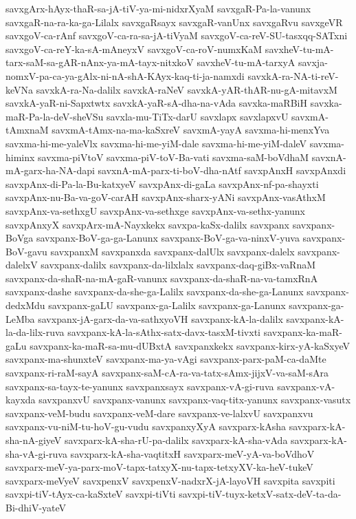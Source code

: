 {savxgArx-hAyx-thaR-sa-jA-tiV-ya-mi-nidxrXyaM
savxgaR-Pa-la-vanunx
savxgaR-na-ra-ka-ga-Lilalx
savxgaRsayx
savxgaR-vanUnx
savxgaRvu
savxgeVR
savxgoV-ca-rAnf
savxgoV-ca-ra-sa-jA-tiVyaM
savxgoV-ca-reV-SU-tasxqq-SATxni
savxgoV-ca-reY-ka-sA-mAneyxV
savxgoV-ca-roV-numxKaM
savxheV-tu-mA-tarx-saM-sa-gAR-nAnx-ya-mA-tayx-nitxkoV
savxheV-tu-mA-tarxyA
savxja-nomxV-pa-ca-ya-gAlx-ni-nA-shA-KAyx-kaq-ti-ja-namxdi
savxkA-ra-NA-ti-reV-keVNa
savxkA-ra-Na-dalilx
savxkA-raNeV
savxkA-yAR-thAR-nu-gA-mitavxM
savxkA-yaR-ni-Sapxtwtx
savxkA-yaR-sA-dha-na-vAda
savxka-maRBiH
savxka-maR-Pa-la-deV-sheVSu
savxla-mu-TiTx-darU
savxlapx
savxlapxvU
savxmA-tAmxnaM
savxmA-tAmx-na-ma-kaSxreV
savxmA-yayA
savxma-hi-menxYva
savxma-hi-me-yaleVlx
savxma-hi-me-yiM-dale
savxma-hi-me-yiM-daleV
savxma-himinx
savxma-piVtoV
savxma-piV-toV-Ba-vati
savxma-saM-boVdhaM
savxnA-mA-garx-ha-NA-dapi
savxnA-mA-parx-ti-boV-dha-nAtf
savxpAnxH
savxpAnxdi
savxpAnx-di-Pa-la-Bu-katxyeV
savxpAnx-di-gaLa
savxpAnx-nf-pa-shayxti
savxpAnx-nu-Ba-va-goV-carAH
savxpAnx-sharx-yANi
savxpAnx-vasAthxM
savxpAnx-va-sethxgU
savxpAnx-va-sethxge
savxpAnx-va-sethx-yanunx
savxpAnxyX
savxpArx-mA-Nayxkekx
savxpa-kaSx-dalilx
savxpanx
savxpanx-BoVga
savxpanx-BoV-ga-ga-Lanunx
savxpanx-BoV-ga-va-ninxV-yuva
savxpanx-BoV-gavu
savxpanxM
savxpanxda
savxpanx-dalUlx
savxpanx-dalelx
savxpanx-dalelxV
savxpanx-dalilx
savxpanx-da-lilxlalx
savxpanx-daq-giBx-vaRnaM
savxpanx-da-shaR-na-mA-gaR-vanunx
savxpanx-da-shaR-na-va-tamxRnA
savxpanx-dashe
savxpanx-da-she-ga-Lalilx
savxpanx-da-she-ga-Lanunx
savxpanx-dedxMdu
savxpanx-gaLU
savxpanx-ga-Lalilx
savxpanx-ga-Lanunx
savxpanx-ga-LeMba
savxpanx-jA-garx-da-va-sathxyoVH
savxpanx-kA-la-dalilx
savxpanx-kA-la-da-lilx-ruva
savxpanx-kA-la-sAthx-satx-davx-tasxM-tivxti
savxpanx-ka-maR-gaLu
savxpanx-ka-maR-sa-mu-dUBxtA
savxpanxkekx
savxpanx-kirx-yA-kaSxyeV
savxpanx-ma-shunxteV
savxpanx-ma-ya-vAgi
savxpanx-parx-paM-ca-daMte
savxpanx-ri-raM-sayA
savxpanx-saM-cA-ra-va-tatx-sAmx-jijxV-va-saM-sAra
savxpanx-sa-tayx-te-yanunx
savxpanxsayx
savxpanx-vA-gi-ruva
savxpanx-vA-kayxda
savxpanxvU
savxpanx-vanunx
savxpanx-vaq-titx-yanunx
savxpanx-vasutx
savxpanx-veM-budu
savxpanx-veM-dare
savxpanx-ve-lalxvU
savxpanxvu
savxpanx-vu-niM-tu-hoV-gu-vudu
savxpanxyXyA
savxparx-kAsha
savxparx-kA-sha-nA-giyeV
savxparx-kA-sha-rU-pa-dalilx
savxparx-kA-sha-vAda
savxparx-kA-sha-vA-gi-ruva
savxparx-kA-sha-vaqtitxH
savxparx-meV-yA-va-boVdhoV
savxparx-meV-ya-parx-moV-tapx-tatxyX-nu-tapx-tetxyXV-ka-heV-tukeV
savxparx-meVyeV
savxpenxV
savxpenxV-nadxrX-jA-layoVH
savxpita
savxpiti
savxpi-tiV-tAyx-ca-kaSxteV
savxpi-tiVti
savxpi-tiV-tuyx-ketxV-satx-deV-ta-da-Bi-dhiV-yateV
}
